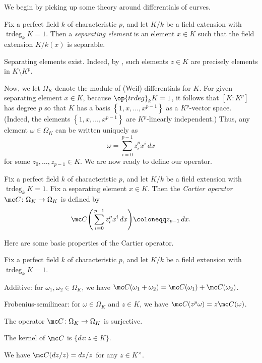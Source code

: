 \documentclass[../thesis.tex]{subfiles}
\begin{document}
We begin by picking up some theory around differentials of curves.
\begin{definition}
	Fix a perfect field $k$ of characteristic $p$, and let $K/k$ be a field extension with $\operatorname{trdeg}_kK=1$. Then a \textit{separating element} is an element $x\in K$ such that the field extension $K/k(x)$ is separable.
\end{definition}
\begin{remark}
	Separating elements exist. Indeed, by \cite[Proposition~3.10.2]{stich-function-fields}, such elements $z\in K$ are precisely elements in $K\setminus K^p$.
\end{remark}
Now, we let $\Omega_K$ denote the module of (Weil) differentials for $K$. For given separating element $x\in K$, because $\op{trdeg}_kK=1$, it follows that $[K:K^p]$ has degree $p$ so that $K$ has a basis $\left\{1,x,\ldots,x^{p-1}\right\}$ as a $K^p$-vector space. (Indeed, the elements $\left\{1,x,\ldots,x^{p-1}\right\}$ are $K^p$-linearly independent.) Thus, any element $\omega\in\Omega_K$ can be written uniquely as
\[\omega=\sum_{i=0}^{p-1}z_i^px^i\,dx\]
for some $z_0,\ldots,z_{p-1}\in K$. We are now ready to define our operator.
\begin{definition}
	Fix a perfect field $k$ of characteristic $p$, and let $K/k$ be a field extension with $\operatorname{trdeg}_kK=1$. Fix a separating element $x\in K$. Then the \textit{Cartier operator} $\mc C\colon\Omega_K\to\Omega_K$ is defined by
	\[\mc C\Bigg(\sum_{i=0}^{p-1}z_i^px^i\,dx\Bigg)\coloneqq z_{p-1}\,dx.\]
\end{definition}
Here are some basic properties of the Cartier operator.
\begin{lemma} \label{lem:basic-cartier}
	Fix a perfect field $k$ of characteristic $p$, and let $K/k$ be a field extension with $\operatorname{trdeg}_kK=1$.
	\begin{listalph}
		\item Additive: for $\omega_1,\omega_2\in\Omega_K$, we have $\mc C(\omega_1+\omega_2)=\mc C(\omega_1)+\mc C(\omega_2)$.
		\item Frobenius-semilinear: for $\omega\in\Omega_K$ and $z\in K$, we have $\mc C(z^p\omega)=z\mc C(\omega)$.
		\item The operator $\mc C\colon\Omega_K\to\Omega_K$ is surjective.
		\item The kernel of $\mc C$ is $\{dz:z\in K\}$.
		\item We have $\mc C(dz/z)=dz/z$ for any $z\in K^\times$.
	\end{listalph}
\end{lemma}
\end{document}
